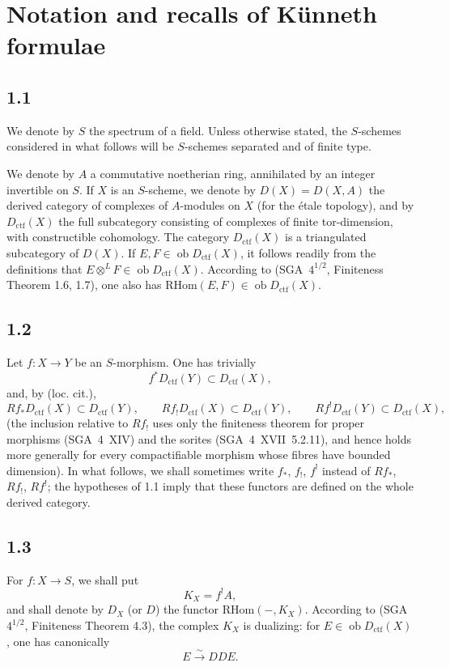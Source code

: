 \documentclass[11pt]{article}
\newcommand{\ob}{\operatorname{ob}}
\providecommand{\RHom}{\mathrm{RHom}}
\providecommand{\ctf}{\mathrm{ctf}}
\begin{document}
\section{Notation and recalls of Künneth formulae}

\subsection*{1.1}
We denote by $S$ the spectrum of a field. Unless otherwise stated, the $S$-schemes considered in what follows will be $S$-schemes separated and of finite type.

We denote by $A$ a commutative noetherian ring, annihilated by an integer invertible on $S$. If $X$ is an $S$-scheme, we denote by $D(X)=D(X,A)$ the derived category of complexes of $A$-modules on $X$ (for the étale topology), and by $D_{\ctf}(X)$ the full subcategory consisting of complexes of finite tor-dimension, with constructible cohomology. The category $D_{\ctf}(X)$ is a triangulated subcategory of $D(X)$. If $E,F\in\ob D_{\ctf}(X)$, it follows readily from the definitions that $E\otimes^L F\in\ob D_{\ctf}(X)$. According to (SGA~$4^{1/2}$, Finiteness Theorem 1.6, 1.7), one also has $\RHom(E,F)\in\ob D_{\ctf}(X)$.

\subsection*{1.2}
Let $f:X\to Y$ be an $S$-morphism. One has trivially
\[
f^{*}D_{\ctf}(Y) \subset D_{\ctf}(X),
\]
and, by (loc. cit.),
\[
Rf_{*}D_{\ctf}(X) \subset D_{\ctf}(Y),\qquad
Rf_{!}D_{\ctf}(X) \subset D_{\ctf}(Y),\qquad
Rf^{!}D_{\ctf}(Y) \subset D_{\ctf}(X),
\]
(the inclusion relative to $Rf_{!}$ uses only the finiteness theorem for proper morphisms (SGA~4~XIV) and the sorites (SGA~4~XVII~5.2.11), and hence holds more generally for every compactifiable morphism whose fibres have bounded dimension). In what follows, we shall sometimes write $f_{*}$, $f_{!}$, $f^{!}$ instead of $Rf_{*}$, $Rf_{!}$, $Rf^{!}$; the hypotheses of 1.1 imply that these functors are defined on the whole derived category.

\subsection*{1.3}
For $f:X\to S$, we shall put
\[
K_X=f^{!}A,
\]
and shall denote by $D_X$ (or $D$) the functor $\RHom(-,K_X)$. According to (SGA~$4^{1/2}$, Finiteness Theorem 4.3), the complex $K_X$ is dualizing: for $E\in\ob D_{\ctf}(X)$, one has canonically
\[
E \xrightarrow{\sim} DDE.
\]
\end{document}
